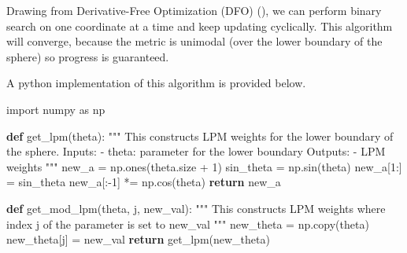 \documentclass[
  letterpaper,
  numbers=noenddot,
  DIV=11,
  oneside]{scrreprt}
\newenvironment{Shaded}{\begin{snugshade}}{\end{snugshade}}
\newcommand{\CommentTok}[1]{\textcolor[rgb]{0.37,0.37,0.37}{#1}}
\newcommand{\ControlFlowTok}[1]{\textcolor[rgb]{0.00,0.23,0.31}{\textbf{#1}}}
\newcommand{\DecValTok}[1]{\textcolor[rgb]{0.68,0.00,0.00}{#1}}
\newcommand{\ImportTok}[1]{\textcolor[rgb]{0.00,0.46,0.62}{#1}}
\newcommand{\KeywordTok}[1]{\textcolor[rgb]{0.00,0.23,0.31}{\textbf{#1}}}
\newcommand{\NormalTok}[1]{\textcolor[rgb]{0.00,0.23,0.31}{#1}}
\newcommand{\OperatorTok}[1]{\textcolor[rgb]{0.37,0.37,0.37}{#1}}
\theoremstyle{remark}
\begin{document}
Drawing from Derivative-Free Optimization (DFO)
(), we
can perform binary search on one coordinate at a time and keep updating
cyclically. This algorithm will converge, because the metric is unimodal
(over the lower boundary of the sphere) so progress is guaranteed.

A python implementation of this algorithm is provided below.

\begin{Shaded}
\begin{Highlighting}[numbers=left,,]
\ImportTok{import}\NormalTok{ numpy }\ImportTok{as}\NormalTok{ np}

\KeywordTok{def}\NormalTok{ get\_lpm(theta):}
    \CommentTok{"""}
\CommentTok{    This constructs LPM weights for the lower boundary of the}
\CommentTok{    sphere.}
\CommentTok{    }
\CommentTok{    Inputs:}
\CommentTok{    {-} theta: parameter for the lower boundary}
\CommentTok{    Outputs:}
\CommentTok{    {-} LPM weights}
\CommentTok{    """}
\NormalTok{    new\_a }\OperatorTok{=}\NormalTok{ np.ones(theta.size }\OperatorTok{+} \DecValTok{1}\NormalTok{)}
\NormalTok{    sin\_theta }\OperatorTok{=}\NormalTok{ np.sin(theta)}
\NormalTok{    new\_a[}\DecValTok{1}\NormalTok{:] }\OperatorTok{=}\NormalTok{ sin\_theta}
\NormalTok{    new\_a[:}\OperatorTok{{-}}\DecValTok{1}\NormalTok{] }\OperatorTok{*=}\NormalTok{ np.cos(theta)}
    \ControlFlowTok{return}\NormalTok{ new\_a}

\KeywordTok{def}\NormalTok{ get\_mod\_lpm(theta, j, new\_val):}
    \CommentTok{"""}
\CommentTok{    This constructs LPM weights where index j of the parameter}
\CommentTok{    is set to new\_val}
\CommentTok{    """}
\NormalTok{    new\_theta }\OperatorTok{=}\NormalTok{ np.copy(theta)}
\NormalTok{    new\_theta[j] }\OperatorTok{=}\NormalTok{ new\_val}
    \ControlFlowTok{return}\NormalTok{ get\_lpm(new\_theta)}


\end{Highlighting}
\end{Shaded}
\end{document}
